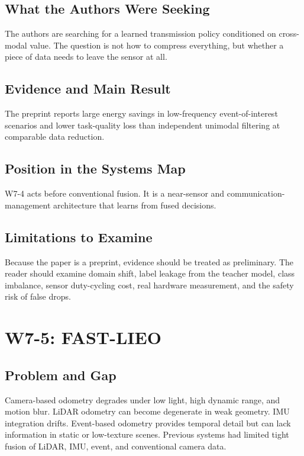 \subsection{What the Authors Were Seeking}

The authors are searching for a learned transmission policy conditioned on cross-modal value. The question is not how to compress everything, but whether a piece of data needs to leave the sensor at all.

\subsection{Evidence and Main Result}

The preprint reports large energy savings in low-frequency event-of-interest scenarios and lower task-quality loss than independent unimodal filtering at comparable data reduction.

\subsection{Position in the Systems Map}

W7-4 acts before conventional fusion. It is a near-sensor and communication-management architecture that learns from fused decisions.

\subsection{Limitations to Examine}

Because the paper is a preprint, evidence should be treated as preliminary. The reader should examine domain shift, label leakage from the teacher model, class imbalance, sensor duty-cycling cost, real hardware measurement, and the safety risk of false drops.

\section{W7-5: FAST-LIEO}

\subsection{Problem and Gap}

Camera-based odometry degrades under low light, high dynamic range, and motion blur. LiDAR odometry can become degenerate in weak geometry. IMU integration drifts. Event-based odometry provides temporal detail but can lack information in static or low-texture scenes. Previous systems had limited tight fusion of LiDAR, IMU, event, and conventional camera data.

